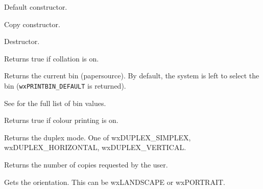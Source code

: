 

\label{wxprintdatactor}


Default constructor.


Copy constructor.


\label{wxprintdatadtor}


Destructor.


\label{wxprintdatagetcollate}


Returns true if collation is on.


\label{wxprintdatagetbin}


Returns the current bin (papersource). By default, the system is left to select
the bin (\texttt{wxPRINTBIN\_DEFAULT} is returned).

See  for the full list of bin values.


\label{wxprintdatagetcolour}


Returns true if colour printing is on.


\label{wxprintdatagetduplex}


Returns the duplex mode. One of wxDUPLEX\_SIMPLEX, wxDUPLEX\_HORIZONTAL, wxDUPLEX\_VERTICAL.


\label{wxprintdatagetnocopies}


Returns the number of copies requested by the user.


\label{wxprintdatagetorientation}


Gets the orientation. This can be wxLANDSCAPE or wxPORTRAIT.


